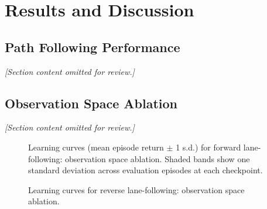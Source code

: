 \chapter{Results and Discussion}
\label{ch:results}

\section{Path Following Performance}
\textit{[Section content omitted for review.]}

\begin{table}[H]
\centering
\caption{Planned run matrix for the experimental campaign}
\label{tab:results_plan_matrix}
\end{table}

\section{Observation Space Ablation}
\label{sec:obs_ablation}
\textit{[Section content omitted for review.]}

\begin{figure}[H]
    \centering
    \caption{Learning curves (mean episode return $\pm$ 1 s.d.) for forward lane-following:
             observation space ablation. Shaded bands show one standard deviation
             across evaluation episodes at each checkpoint.}
    \label{fig:forward_obs_ablation}
\end{figure}

\begin{figure}[H]
    \centering
    \caption{Learning curves for reverse lane-following: observation space ablation.}
    \label{fig:reverse_obs_ablation}
\end{figure}

\begin{table}[H]
\centering
\caption{Forward lane-following: observation space ablation (dense reward, no obstacles, 30~eval episodes).}
\label{tab:obs_ablation_forward}
\end{table}
\begin{table}[H]
\centering
\caption{Reverse lane-following: observation space ablation (dense reward, no obstacles, 30~eval episodes).}
\label{tab:obs_ablation_reverse}
\end{table}

